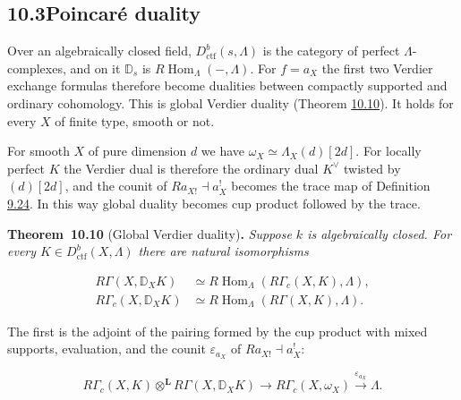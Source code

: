 \documentclass[11pt]{article}
\newenvironment{bpstatement}[2]{\par\addvspace{0.6\baselineskip}\noindent\textbf{#1}#2\textbf{.}\enspace\ignorespaces}
  {\par\addvspace{0.4\baselineskip}}
\newenvironment{bpstatementit}[2]{\begin{bpstatement}{#1}{#2}\itshape\ignorespaces}{\end{bpstatement}}
\begin{document}
\subsection*{\texorpdfstring{10.3\quad Poincaré duality}{10.3 Poincaré duality}}
\label{bp130}%
\label{bp131}%
Over an algebraically closed field, \(D^b_{\mathrm{ctf}}(s,\Lambda)\) is the category of perfect \(\Lambda\)-complexes, and on it \(\mathbb D_s\) is \(R\!\operatorname{Hom}_\Lambda(-,\Lambda)\). For \(f=a_X\) the first two Verdier exchange formulas therefore become dualities between compactly supported and ordinary cohomology. This is global Verdier duality (Theorem \hyperref[bp132]{10.10}). It holds for every \(X\) of finite type, smooth or not.

For smooth \(X\) of pure dimension \(d\) we have \(\omega_X\simeq\Lambda_X(d)[2d]\). For locally perfect \(K\) the Verdier dual is therefore the ordinary dual \(K^\vee\) twisted by \((d)[2d]\), and the counit of \(Ra_{X!}\dashv a_X^!\) becomes the trace map of Definition \hyperref[bp85]{9.24}. In this way global duality becomes cup product followed by the trace.

\label{bp132}%
\begin{bpstatementit}{Theorem~10.10}{ (Global Verdier duality)}
Suppose \(k\) is algebraically closed. For every \(K\in D^b_{\mathrm{ctf}}(X,\Lambda)\) there are natural isomorphisms

\begin{align*}
R\Gamma(X,\mathbb D_XK)&\simeq
R\!\operatorname{Hom}_\Lambda(R\Gamma_c(X,K),\Lambda),
\tag{10.5}\\
R\Gamma_c(X,\mathbb D_XK)&\simeq
R\!\operatorname{Hom}_\Lambda(R\Gamma(X,K),\Lambda).
\tag{10.6}\end{align*}

The first is the adjoint of the pairing formed by the cup product with mixed supports, evaluation, and the counit \(\varepsilon_{a_X}\) of \(Ra_{X!}\dashv a_X^!\):

\[
R\Gamma_c(X,K)\otimes^{\mathbf L}R\Gamma(X,\mathbb D_XK)
\longrightarrow R\Gamma_c(X,\omega_X)
\xrightarrow{\varepsilon_{a_X}}\Lambda.
\]
\end{bpstatementit}
\end{document}

